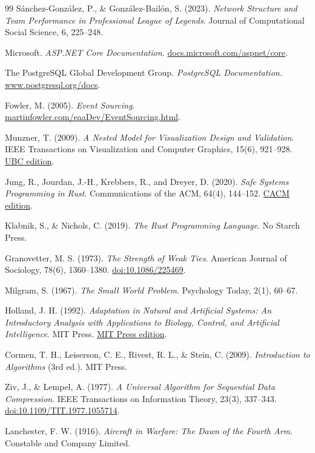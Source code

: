 ﻿\documentclass[a4paper,12pt]{report}
\begin{document}
\begin{thebibliography}{99}
Sánchez-González, P., \& González-Bailón, S. (2023). \textit{Network Structure and Team Performance in Professional League of Legends}. Journal of Computational Social Science, 6, 225--248.

Microsoft. \textit{ASP.NET Core Documentation.} \href{https://docs.microsoft.com/en-us/aspnet/core/}{docs.microsoft.com/aspnet/core}.

The PostgreSQL Global Development Group. \textit{PostgreSQL Documentation.} \href{https://www.postgresql.org/docs/}{www.postgresql.org/docs}.

Fowler, M. (2005). \textit{Event Sourcing}. \href{https://www.martinfowler.com/eaaDev/EventSourcing.html}{martinfowler.com/eaaDev/EventSourcing.html}.

Munzner, T. (2009). \textit{A Nested Model for Visualization Design and Validation}. IEEE Transactions on Visualization and Computer Graphics, 15(6), 921--928. \href{https://www.cs.ubc.ca/labs/imager/tr/2009/NestedModel/}{UBC edition}.

Jung, R., Jourdan, J.-H., Krebbers, R., and Dreyer, D. (2020). \textit{Safe Systems Programming in Rust}. Communications of the ACM, 64(4), 144--152. \href{https://cacm.acm.org/research/safe-systems-programming-in-rust/}{CACM edition}.

Klabnik, S., \& Nichols, C. (2019). \textit{The Rust Programming Language}. No Starch Press.

Granovetter, M. S. (1973). \textit{The Strength of Weak Ties}. American Journal of Sociology, 78(6), 1360--1380. \href{https://doi.org/10.1086/225469}{doi:10.1086/225469}.

Milgram, S. (1967). \textit{The Small World Problem}. Psychology Today, 2(1), 60--67.

Holland, J. H. (1992). \textit{Adaptation in Natural and Artificial Systems: An Introductory Analysis with
Applications to Biology, Control, and Artificial Intelligence}. MIT Press.
\href{https://direct.mit.edu/books/monograph/2574/}{MIT Press edition}.

Cormen, T. H., Leiserson, C. E., Rivest, R. L., \& Stein, C. (2009).
\textit{Introduction to Algorithms} (3rd ed.). MIT Press.

Ziv, J., \& Lempel, A. (1977). \textit{A Universal Algorithm for Sequential Data Compression}.
IEEE Transactions on Information Theory, 23(3), 337--343.
\href{https://doi.org/10.1109/TIT.1977.1055714}{doi:10.1109/TIT.1977.1055714}.

Lanchester, F. W. (1916). \textit{Aircraft in Warfare: The Dawn of the Fourth Arm}.
Constable and Company Limited.

\end{thebibliography}
\end{document}
